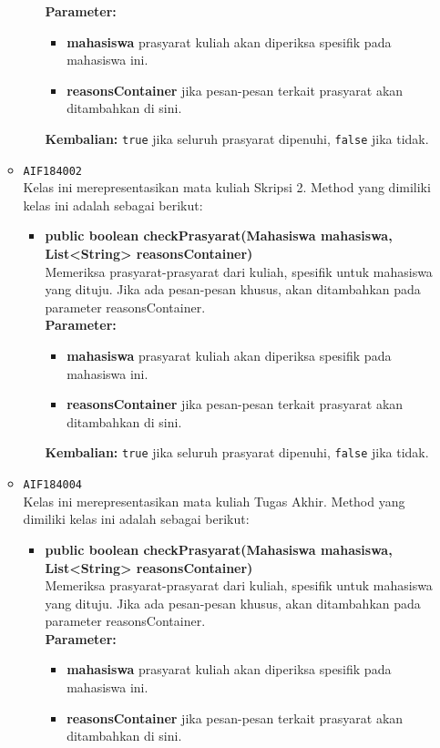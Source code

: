 \begin{enumerate}
\begin{itemize}
\begin{itemize}
\textbf{Parameter:}
\begin{itemize}
\item \textbf{mahasiswa} prasyarat kuliah akan diperiksa spesifik pada mahasiswa ini.
\item \textbf{reasonsContainer} jika pesan-pesan terkait prasyarat akan ditambahkan di sini.
\end{itemize}
\textbf{Kembalian:} \texttt{true} jika seluruh prasyarat dipenuhi, \texttt{false} jika tidak.
\end{itemize}
\item \texttt{AIF184002} \\
Kelas ini merepresentasikan mata kuliah Skripsi 2. Method yang dimiliki kelas ini adalah sebagai berikut: 
\begin{itemize}
\item \textbf{public boolean checkPrasyarat(Mahasiswa mahasiswa, List<String> reasonsContainer)}\\
Memeriksa prasyarat-prasyarat dari kuliah, spesifik untuk mahasiswa yang dituju. Jika ada pesan-pesan khusus, akan ditambahkan pada parameter reasonsContainer.\\
\textbf{Parameter:}
\begin{itemize}
\item \textbf{mahasiswa} prasyarat kuliah akan diperiksa spesifik pada mahasiswa ini.
\item \textbf{reasonsContainer} jika pesan-pesan terkait prasyarat akan ditambahkan di sini.
\end{itemize}
\textbf{Kembalian:} \texttt{true} jika seluruh prasyarat dipenuhi, \texttt{false} jika tidak.
\end{itemize}
\item \texttt{AIF184004} \\
Kelas ini merepresentasikan mata kuliah Tugas Akhir. Method yang dimiliki kelas ini adalah sebagai berikut: 
\begin{itemize}
\item \textbf{public boolean checkPrasyarat(Mahasiswa mahasiswa, List<String> reasonsContainer)}\\
Memeriksa prasyarat-prasyarat dari kuliah, spesifik untuk mahasiswa yang dituju. Jika ada pesan-pesan khusus, akan ditambahkan pada parameter reasonsContainer.\\
\textbf{Parameter:}
\begin{itemize}
\item \textbf{mahasiswa} prasyarat kuliah akan diperiksa spesifik pada mahasiswa ini.
\item \textbf{reasonsContainer} jika pesan-pesan terkait prasyarat akan ditambahkan di sini.

\end{itemize}
\end{itemize}
\end{itemize}
\end{enumerate}
